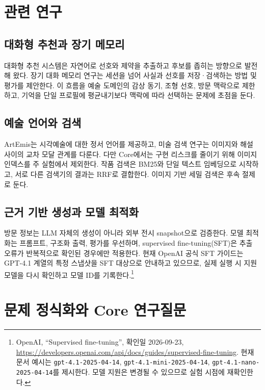 \documentclass[10pt,a4paper,twocolumn]{article}
\newcommand{\ProjectName}{ARTHÉMIS-Core}
\begin{document}
\section{관련 연구}
\subsection{대화형 추천과 장기 메모리}
대화형 추천 시스템은 자연어로 선호와 제약을 추출하고 후보를 좁히는 방향으로 발전해 왔다\cite{jannach2021crs,friedman2023recllm}. 장기 대화 메모리 연구는 세션을 넘어 사실과 선호를 저장·검색하는 방법 및 평가를 제안한다\cite{maharana2024locomo,wu2025longmemeval,xu2025amem}.  이 흐름을 예술 도메인의 감상 동기, 조형 선호, 방문 맥락으로 제한하고, 기억을 단일 프로필에 평균내기보다 맥락에 따라 선택하는 문제에 초점을 둔다.

\subsection{예술 언어와 검색}
ArtEmis는 시각예술에 대한 정서 언어를 제공하고\cite{achlioptas2021artemis}, 미술 검색 연구는 이미지와 해설 사이의 교차 모달 관계를 다룬다. 다만 Core에서는 구현 리스크를 줄이기 위해 이미지 인덱스를 주 실험에서 제외한다. 작품 검색은 BM25와 단일 텍스트 임베딩으로 시작하고, 서로 다른 검색기의 결과는 RRF로 결합한다\cite{cormack2009rrf}. 이미지 기반 세밀 검색은 후속 절제로 둔다.

\subsection{근거 기반 생성과 모델 최적화}
방문 정보는 LLM 자체의 생성이 아니라 외부 전시 snapshot으로 검증한다. 모델 최적화는 프롬프트, 구조화 출력, 평가를 우선하며, supervised fine-tuning(SFT)은 추출 오류가 반복적으로 확인된 경우에만 적용한다. 현재 OpenAI 공식 SFT 가이드는 GPT-4.1 계열의 특정 스냅샷을 SFT 대상으로 안내하고 있으므로, 실제 실행 시 지원 모델을 다시 확인하고 모델 ID를 기록한다.\footnote{OpenAI, ``Supervised fine-tuning'', 확인일 2026-09-23, \url{https://developers.openai.com/api/docs/guides/supervised-fine-tuning}. 현재 문서 예시는 \texttt{gpt-4.1-2025-04-14}, \texttt{gpt-4.1-mini-2025-04-14}, \texttt{gpt-4.1-nano-2025-04-14}를 제시한다. 모델 지원은 변경될 수 있으므로 실험 시점에 재확인한다.}

\section{문제 정식화와 Core 연구질문}
\end{document}
